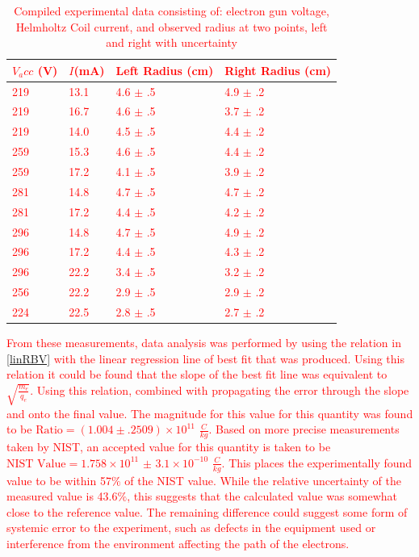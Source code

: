 \documentclass[%
 reprint,
 amsmath,amssymb,
 aps,
]{revtex4-2}
\begin{document}
\begin{table}[h]
\textcolor{red}{\begin{tabular}{llll}
$V_acc$ (V) & $I$(mA) & Left Radius (cm) & Right Radius (cm) \\ \hline
\hline 219 & 13.1 & 4.6 $\pm$ .5 & 4.9 $\pm$ .2 \\
219 & 16.7 & 4.6  $\pm$ .5 & 3.7 $\pm$ .2 \\
219 & 14.0 & 4.5 $\pm$ .5 & 4.4 $\pm$ .2 \\
259 & 15.3 & 4.6 $\pm$ .5 & 4.4 $\pm$ .2 \\
259 & 17.2 & 4.1 $\pm$ .5 & 3.9 $\pm$ .2 \\
281 & 14.8 & 4.7 $\pm$ .5 & 4.7 $\pm$ .2 \\
281 & 17.2 & 4.4 $\pm$ .5 & 4.2 $\pm$ .2 \\
296 & 14.8 & 4.7 $\pm$ .5 & 4.9 $\pm$ .2 \\
296 & 17.2 & 4.4 $\pm$ .5 & 4.3 $\pm$ .2 \\
296 & 22.2 & 3.4 $\pm$ .5 & 3.2 $\pm$ .2 \\
256 & 22.2 & 2.9 $\pm$ .5 & 2.9 $\pm$ .2 \\
224 & 22.5 & 2.8 $\pm$ .5 & 2.7 $\pm$ .2 \\ \hline \hline
\end{tabular}}
\caption{\textcolor{red}{Compiled experimental data consisting of: electron gun voltage, Helmholtz Coil current, and observed radius at two points, left and right with uncertainty}}
\end{table}

\textcolor{red}{From these measurements, data analysis was performed \cite{supp} by using the relation in \eqref{linRBV} with the linear regression line of best fit that was produced. Using this relation it could be found that the slope of the best fit line was equivalent to $\sqrt{\frac{m_e}{q_e}}$. Using this relation, combined with propagating the error through the slope and onto the final value. The magnitude for this value for this quantity was found to be $\text{Ratio} = ( 1.004 \pm .2509 )\times 10^{11}$ $\frac{C}{kg}$. Based on more precise measurements taken by NIST, an accepted value for this quantity is taken to be $\text{NIST Value} = 1.758 \times 10^{11}$  $\pm$ $3.1 \times 10^{-10}$  $\frac{C}{kg}$. This places the experimentally found value to be within 57$\%$ of the NIST value. While the relative uncertainty of the measured value is 43.6$\%$, this suggests that the calculated value was somewhat close to the reference value. The remaining difference could suggest some form of systemic error to the experiment, such as defects in the equipment used or interference from the environment affecting the path of the electrons.}
\end{document}
